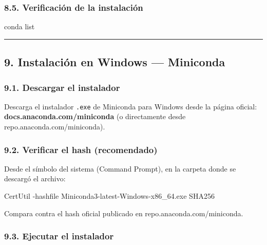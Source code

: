 \documentclass[
  doc,
  floatsintext,
  longtable,
  a4paper,
  nolmodern,
  notxfonts,
  notimes,
  12pt,
  colorlinks=true,linkcolor=blue,citecolor=blue,urlcolor=blue]{apa7}
\newenvironment{Shaded}{\begin{snugshade}}{\end{snugshade}}
\newcommand{\AttributeTok}[1]{\textcolor[rgb]{0.40,0.45,0.13}{#1}}
\newcommand{\ExtensionTok}[1]{\textcolor[rgb]{0.00,0.23,0.31}{#1}}
\newcommand{\NormalTok}[1]{\textcolor[rgb]{0.00,0.23,0.31}{#1}}
\begin{document}
\subsubsection{8.5. Verificación de la
instalación}\label{verificaciuxf3n-de-la-instalaciuxf3n-1}

\begin{Shaded}
\begin{Highlighting}[]
\ExtensionTok{conda}\NormalTok{ list}
\end{Highlighting}
\end{Shaded}

\begin{center}\rule{0.5\linewidth}{0.5pt}\end{center}

\subsection{9. Instalación en Windows ---
Miniconda}\label{instalaciuxf3n-en-windows-miniconda}

\subsubsection{9.1. Descargar el
instalador}\label{descargar-el-instalador-2}

Descarga el instalador \texttt{.exe} de Miniconda para Windows desde la
página oficial: \textbf{docs.anaconda.com/miniconda} (o directamente
desde repo.anaconda.com/miniconda).

\subsubsection{9.2. Verificar el hash
(recomendado)}\label{verificar-el-hash-recomendado-2}

Desde el símbolo del sistema (Command Prompt), en la carpeta donde se
descargó el archivo:

\begin{Shaded}
\begin{Highlighting}[]
\NormalTok{CertUtil }\AttributeTok{{-}hashfile}\NormalTok{ Miniconda3}\AttributeTok{{-}latest{-}Windows{-}x86\_64}\NormalTok{.exe SHA256}
\end{Highlighting}
\end{Shaded}

Compara contra el hash oficial publicado en repo.anaconda.com/miniconda.

\subsubsection{9.3. Ejecutar el
instalador}\label{ejecutar-el-instalador-2}
\end{document}
